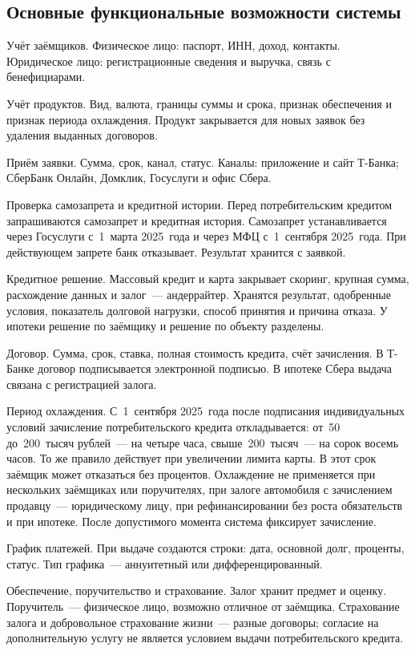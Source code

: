 \documentclass[14pt,a4paper]{extarticle}
\begin{document}
\subsection{Основные функциональные возможности системы}

Учёт заёмщиков. Физическое лицо: паспорт, ИНН, доход, контакты. Юридическое лицо: регистрационные сведения и выручка, связь с бенефициарами.

Учёт продуктов. Вид, валюта, границы суммы и срока, признак обеспечения и признак периода охлаждения. Продукт закрывается для новых заявок без удаления выданных договоров.

Приём заявки. Сумма, срок, канал, статус. Каналы: приложение и сайт Т-Банка; СберБанк Онлайн, Домклик, Госуслуги и офис Сбера.

Проверка самозапрета и кредитной истории. Перед потребительским кредитом запрашиваются самозапрет и кредитная история. Самозапрет устанавливается через Госуслуги с~1~марта 2025~года и через МФЦ с~1~сентября 2025~года. При действующем запрете банк отказывает. Результат хранится с заявкой.

Кредитное решение. Массовый кредит и карта закрывает скоринг, крупная сумма, расхождение данных и залог~--- андеррайтер. Хранятся результат, одобренные условия, показатель долговой нагрузки, способ принятия и причина отказа. У ипотеки решение по заёмщику и решение по объекту разделены.

Договор. Сумма, срок, ставка, полная стоимость кредита, счёт зачисления. В Т-Банке договор подписывается электронной подписью. В ипотеке Сбера выдача связана с регистрацией залога.

Период охлаждения. С~1~сентября 2025~года после подписания индивидуальных условий зачисление потребительского кредита откладывается: от~50 до~200~тысяч рублей~--- на четыре часа, свыше~200~тысяч~--- на сорок восемь часов. То же правило действует при увеличении лимита карты. В этот срок заёмщик может отказаться без процентов. Охлаждение не применяется при нескольких заёмщиках или поручителях, при залоге автомобиля с зачислением продавцу~--- юридическому лицу, при рефинансировании без роста обязательств и при ипотеке. После допустимого момента система фиксирует зачисление.

График платежей. При выдаче создаются строки: дата, основной долг, проценты, статус. Тип графика~--- аннуитетный или дифференцированный.

Обеспечение, поручительство и страхование. Залог хранит предмет и оценку. Поручитель~--- физическое лицо, возможно отличное от заёмщика. Страхование залога и добровольное страхование жизни~--- разные договоры; согласие на дополнительную услугу не является условием выдачи потребительского кредита.
\end{document}
